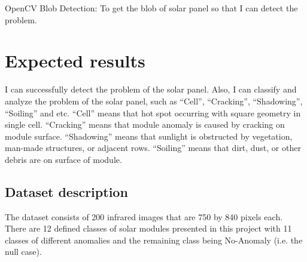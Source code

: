 \documentclass[11pt,twocolumn,letterpaper]{article}
\begin{document}
\begin{CJK*}{UTF8}{bsmi}
OpenCV Blob Detection: To get the blob of solar panel so that I can detect the problem.



\section{Expected results}
I can successfully detect the problem of the solar panel. Also, I can classify and analyze the problem of the solar panel, such as “Cell”, “Cracking”, “Shadowing”, “Soiling” and etc. “Cell” means that hot spot occurring with square geometry in single cell. “Cracking” means that module anomaly is caused by cracking on module surface. “Shadowing” means that sunlight is obstructed by vegetation, man-made structures, or adjacent rows. “Soiling” means that dirt, dust, or other debris are on surface of module.

\subsection{Dataset description}
The dataset consists of 200 infrared images that are 750 by 840 pixels each. There are 12 defined classes of solar modules presented in this project with 11 classes of different anomalies and the remaining class being No-Anomaly (i.e. the null case).



\end{CJK*}
\end{document}

